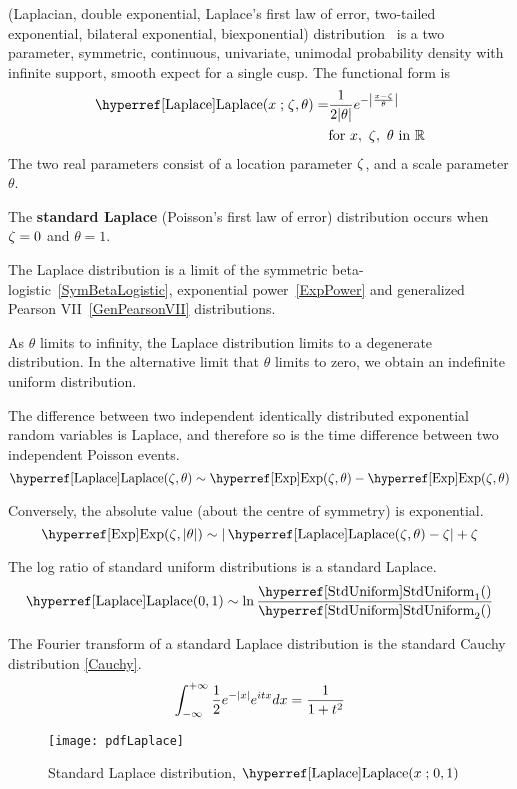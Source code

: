 

\label{sec:Laplace}
 (Laplacian, double exponential, Laplace's first law of error, two-tailed exponential, bilateral exponential, biexponential) distribution~\cite{Laplace1774,Stigler1986,Kotz2001}
 is  a two parameter, symmetric, continuous, univariate, unimodal probability density with infinite support, smooth expect for a single cusp.
The functional form is
\begin{align}
\label{Laplace}
\opr{Laplace}(x\given \pLoc, \theta) = & 
\frac{1}{2 |\theta|} e^{- \left| \frac{x-\pLoc}{\theta}\right|} 		\checked
\\
\notag
& \text{for } x,\ \pLoc,\  \theta \text{ in }  \mathbb{R}			\checked
\end{align}
The two real parameters consist of a location parameter $\zeta$,  and a scale parameter $\theta$.




The {\bf standard Laplace} (Poisson's first law of error) distribution occurs when $\zeta=0$ and $\theta=1$.




The Laplace distribution is a limit of the symmetric beta-logistic~\eqref{SymBetaLogistic}, exponential power~\eqref{ExpPower} and generalized Pearson VII~\eqref{GenPearsonVII} distributions.

As $\theta$ limits to infinity, the Laplace distribution limits to a degenerate distribution. In the alternative limit that $\theta$ limits to zero, we obtain an indefinite uniform distribution.


The difference between two independent identically distributed exponential random variables is Laplace, and therefore so is the time difference between two independent Poisson events.
\[
\opr{Laplace}(\pLoc, \theta) \sim  \opr{Exp}(\pLoc,\theta) - \opr{Exp}(\pLoc,\theta)
\notag
\]

Conversely, the absolute value (about the centre of symmetry) is exponential. 
\[
\opr{Exp}(\pLoc, |\theta|) \sim  |\opr{Laplace}(\pLoc,\theta) - \pLoc | +\pLoc
\notag
\]


The log ratio of standard uniform distributions is a standard Laplace.
\[
\opr{Laplace}(0,1) \sim \ln \frac{\opr{StdUniform}_1() }{\opr{StdUniform}_2()} \checked
\notag
\]


The Fourier transform of a standard Laplace distribution is the standard Cauchy distribution \eqref{Cauchy}.
\[
\int_{-\infty}^{+\infty} \frac{1}{2}e^{-| x |} e^{i t x} dx = \frac{1}{1+t^2}
\checked
\notag
\]



\begin{figure}[t!]
\begin{center}
\texttt{[image: pdfLaplace]}
\end{center}
\caption[Standard Laplace distribution]{Standard Laplace distribution, $\opr{Laplace}(x\given 0,1)$}
\end{figure}



